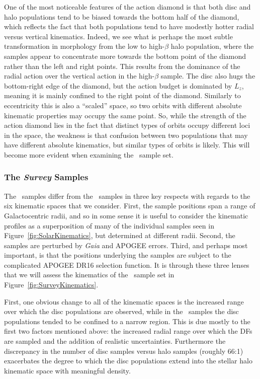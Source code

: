 One of the most noticeable features of the action diamond is that both disc and halo populations tend to be biased towards the bottom half of the diamond, which reflects the fact that both populations tend to have modestly hotter radial versus vertical kinematics. Indeed, we see what is perhaps the most subtle transformation in morphology from the low to high-$\beta$ halo population, where the samples appear to concentrate more towards the bottom point of the diamond rather than the left and right points. This results from the dominance of the radial action over the vertical action in the high-$\beta$ sample. The disc also hugs the bottom-right edge of the diamond, but the action budget is dominated by $L_{z}$, meaning it is mainly confined to the right point of the diamond. Similarly to eccentricity this is also a ``scaled'' space, so two orbits with different absolute kinematic properties may occupy the same point. So, while the strength of the action diamond lies in the fact that distinct types of orbits occupy different loci in the space, the weakness is that confusion between two populations that may have different absolute kinematics, but similar types of orbits is likely. This will become more evident when examining the \survey\ sample set.

\subsubsection{The \textit{Survey} Samples}

The \survey\ samples differ from the \solar\ samples in three key respects with regards to the six kinematic spaces that we consider. First, the sample positions span a range of Galactocentric radii, and so in some sense it is useful to consider the kinematic profiles as a superposition of many of the individual samples seen in Figure~\ref{fig:SolarKinematics}, but determined at different radii. Second, the samples are perturbed by \textit{Gaia} and APOGEE errors. Third, and perhaps most important, is that the positions underlying the samples are subject to the complicated APOGEE DR16 selection function. It is through these three lenses that we will assess the kinematics of the \survey\ sample set in Figure~\ref{fig:SurveyKinematics}.

First, one obvious change to all of the kinematic spaces is the increased range over which the disc populations are observed, while in the \solar\ samples the disc populations tended to be confined to a narrow region. This is due mostly to the first two factors mentioned above: the increased radial range over which the DFs are sampled and the addition of realistic uncertainties. Furthermore the discrepancy in the number of disc samples versus halo samples (roughly 66:1) exacerbates the degree to which the disc populations extend into the stellar halo kinematic space with meaningful density.

